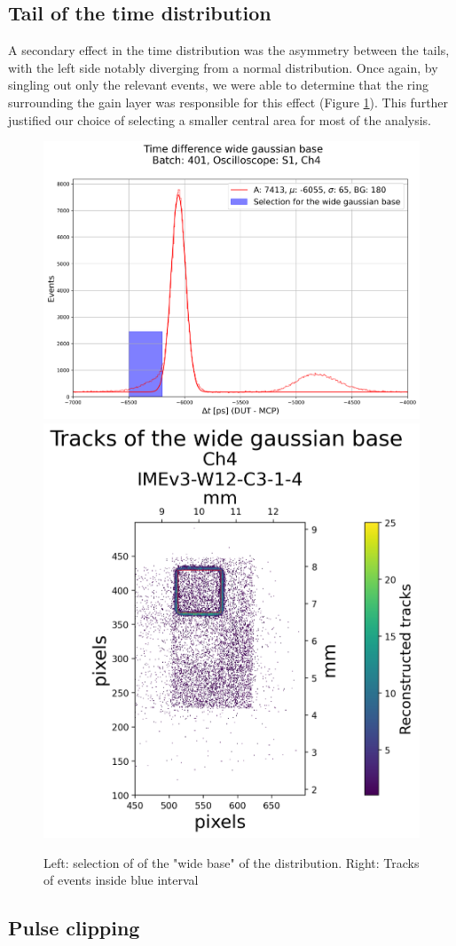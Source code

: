 \subsection{Tail of the time distribution}\label{sec:deviations_from_gaussian}
A secondary effect in the time distribution was the asymmetry between the tails, with the left side notably diverging from a normal distribution. Once again, by singling out only the relevant events, we were able to determine that the ring surrounding the gain layer was responsible for this effect (Figure \ref{fig:time_difference_wide_gaussian}). This further justified our choice of selecting a smaller central area for most of the analysis.

\begin{figure}[!ht]
    \centering
    \includegraphics[width=.55\linewidth]{Images/detailed_analysis/time_difference_401_S1_dut_3_with_wide gaussian_left.png}
    \hfill
    \includegraphics[width=.43\linewidth]{Images/detailed_analysis/2D Tracks 401_S1_dut_3_with_wide_gaussian_base_left.png}
    \caption{Left: selection of of the "wide base" of the distribution.
    Right: Tracks of events inside blue interval}
    \label{fig:time_difference_wide_gaussian}
\end{figure}

\subsection{Pulse clipping}\label{sec:pulse_clipping}

